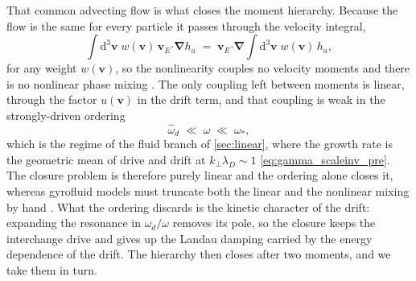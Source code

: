 \documentclass{jpp}
\newcommand{\rmd}{\text{d}}
\newcommand{\bv}{\mathbf{v}}
\renewcommand{\vec}[1]{\boldsymbol{#1}}
\newcommand{\vec}[1]{\boldsymbol{#1}}
\providecommand{\bcdot}{\vec{\cdot}}
\newcommand{\grad}{{\vec{\nabla}}}
\newcommand{\kperp}{k_\perp}
\newcommand{\lambdaD}{\lambda_D}
\begin{document}
That common advecting flow is what closes the moment hierarchy. Because the flow is the same for every particle it passes through the velocity integral,
\begin{equation}\label{eq:app_fluid_factorise}
\int \rmd^3\bv\; w(\bv)\,\vec{v}_E\bcdot\grad h_a \;=\; \vec{v}_E\bcdot\grad \int \rmd^3\bv\; w(\bv)\,h_a ,
\end{equation}
for any weight $w(\bv)$, so the nonlinearity couples no velocity moments and there is no nonlinear phase mixing \citep{Dorland1993}. The only coupling left between moments is linear, through the factor $u(\bv)$ in the drift term, and that coupling is weak in the strongly-driven ordering
\begin{equation}\label{eq:app_fluid_ordering}
\hat\omega_d \;\ll\; \omega \;\ll\; \omega_* ,
\end{equation}
which is the regime of the fluid branch of \cref{sec:linear}, where the growth rate is the geometric mean of drive and drift at $\kperp\lambdaD \sim 1$ \cref{eq:gamma_scaleinv_pre}. The closure problem is therefore purely linear and the ordering alone closes it, whereas gyrofluid models must truncate both the linear and the nonlinear mixing by hand \citep{Dorland1993}. What the ordering discards is the kinetic character of the drift: expanding the resonance in $\hat\omega_d/\omega$ removes its pole, so the closure keeps the interchange drive and gives up the Landau damping carried by the energy dependence of the drift. The hierarchy then closes after two moments, and we take them in turn.
\end{document}
